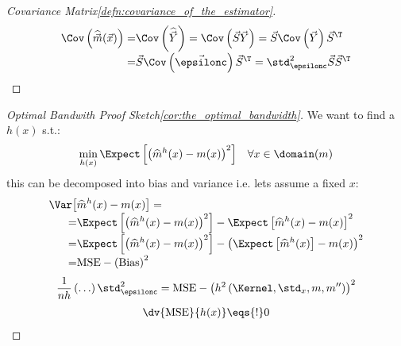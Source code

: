 \begin{proofbox}\nospacing
    \begin{proof}[Covariance Matrix\cref{defn:covariance_of_the_estimator}]\label{proof:defn:covariance_of_the_estimator}
        \begin{align*}
          \Cov\left(\widehat{\vec{m}}(\vec{x})\right)=&\Cov\left(\widehat{\vec{Y}}\right)=
          \Cov\left(\vec{S}\vec{Y}\right)=\vec{S}\Cov\left(\vec{Y}\right)\vec{S}^{\T}\\[-1\jot]
          =&\vec{S}\Cov\left(\vec{\epsilonc}\right)\vec{S}^{\T}=\std_{\epsilonc}^{2}\vec{S}\vec{S}^{\T}
        \end{align*}
    \end{proof}
\end{proofbox}
\begin{proofbox}\nospacing
    \begin{proof}[Optimal Bandwith Proof Sketch\cref{cor:the_optimal_bandwidth}]\label{proof:cor:the_optimal_bandwidth}
        We want to find a $h(x)$ s.t.:
        \begin{align}
          \min_{h(x)}\Expect \left[\left(\widehat{m}^{h}(x)-m(x)\right)^{2}\right]&&\forall x\in\domain(m)
        \end{align}
        this can be decomposed into bias and variance i.e. lets assume a fixed $x$:
        \begin{align*}
          \Var\big[&\widehat{m}^{h}(x)-m(x)\big]=\\[-1\jot]
        =&\Expect \left[\left(\widehat{m}^{h}(x)-m(x)\right)^{2}\right]
          -\Expect \left[\widehat{m}^{h}(x)-m(x)\right]^{2}\\[-1\jot]
          =&\Expect \left[\left(\widehat{m}^{h}(x)-m(x)\right)^{2}\right]
          -\left(\Expect \left[\widehat{m}^{h}(x)\right]-m(x)\right)^{2}\\[-1\jot]
          =&\text{MSE}-\left(\text{Bias}\right)^{2}
        \end{align*}
        \begin{align*}
          \frac{1}{nh}\left(\ldots\right)\std_{\epsilonc}^{2}=\text{MSE}-\left(h^{2}\left(\Kernel,\std_{x},m,m''\right)\right)^{2}
        \end{align*}
        \begin{align*}
          \dv{\text{MSE}}{h(x)}\eqs{!}0
        \end{align*}
    \end{proof}
\end{proofbox}

